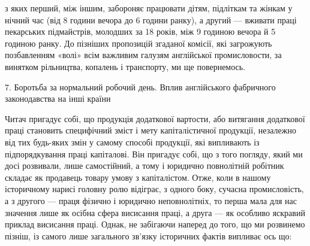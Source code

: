 з яких перший, між іншим, забороняє працювати дітям, підліткам
та жінкам у нічний час (від 8 години вечора до 6 години
ранку), а другий — вживати праці пекарських підмайстрів, молодших
за 18 років, між 9 годиною вечора й 5 годиною ранку.
До пізніших пропозицій згаданої комісії, які загрожують позбавленням
«волі» всім важливим галузям англійської промисловости,
за винятком рільництва, копалень і транспорту, ми ще
повернемось.\footnoteA{
(Примітка до другого видання). Від року 1866, коли я писав те,
що є в тексті, знову надійшла реакція. [Капіталісти тих галузей про-
}

7. Боротьба за нормальний робочий день. Вплив англійського
фабричного законодавства на інші країни

Читач пригадує собі, що продукція додаткової вартости, або
витягання додаткової праці становить специфічний зміст і мету
капіталістичної продукції, незалежно від тих будь-яких змін
у самому способі продукції, які випливають із підпорядкування
праці капіталові. Він пригадує собі, що з того погляду, який
ми досі розвивали, лише самостійний, а тому і юридично повнолітній
робітник складає як продавець товару умову з капіталістом.
Отже, коли в нашому історичному нарисі головну ролю
відіграє, з одного боку, сучасна промисловість, а з другого —
праця фізично і юридично неповнолітніх, то перша мала для
нас значення лише як осібна сфера висисання праці, а друга —
як особливо яскравий приклад висисання праці. Однак, не забігаючи
наперед до того, що ми розвинемо пізніш, із самого лише
загального зв’язку історичних фактів випливає ось що:

